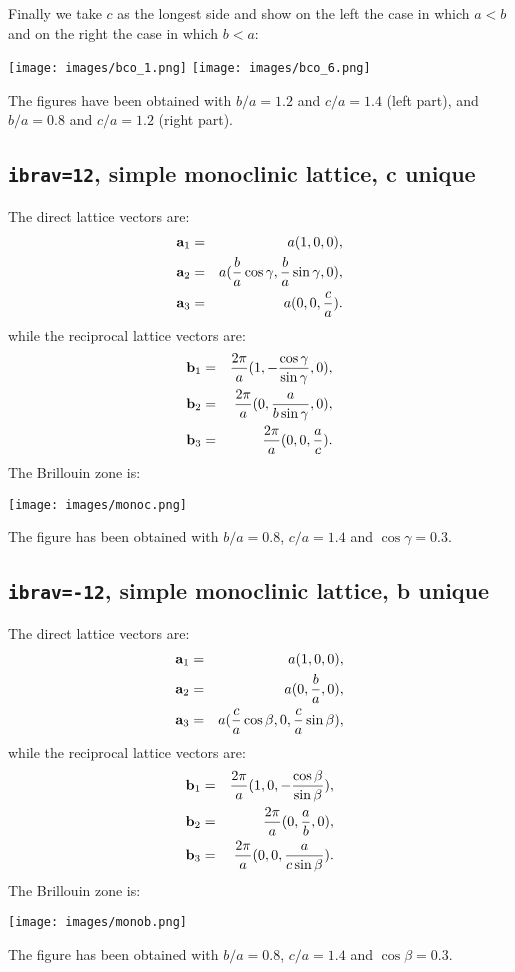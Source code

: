 \documentclass[12pt,a4paper]{article}
\begin{document}
Finally we take $c$ as the longest side and show on the left the case in 
which $a<b$ and on the right the case in which $b<a$:
\begin{center}
\texttt{[image: images/bco\_1.png]} \hspace{1.0 cm}
\texttt{[image: images/bco\_6.png]}
\end{center}
The figures have been obtained with $b/a=1.2$ and $c/a=1.4$ (left part), and
$b/a=0.8$ and $c/a=1.2$ (right part).

\subsection{\texttt{ibrav=12}, simple monoclinic lattice, c unique}
The direct lattice vectors are:
\begin{eqnarray}
{\bf a}_1 &=& a (1, 0, 0), \nonumber \\
{\bf a}_2 &=& a ({b \over a} \cos{\gamma}, {b \over a}\sin{\gamma}, 0), \nonumber \\
{\bf a}_3 &=& a (0, 0, {c \over a}). 
\nonumber
\end{eqnarray}
while the reciprocal lattice vectors are:
\begin{eqnarray}
{\bf b}_1 &=& {2\pi \over a} (1, -{\cos{\gamma}\over \sin{\gamma}}, 0), \nonumber \\
{\bf b}_2 &=& {2\pi \over a} (0, {a \over b \sin{\gamma}}, 0), \nonumber \\
{\bf b}_3 &=& {2\pi \over a} (0, 0, {a \over c}). \nonumber
\end{eqnarray}
The Brillouin zone is: 
\begin{center}
\texttt{[image: images/monoc.png]} 
\end{center}
The figure has been obtained with $b/a=0.8$, $c/a=1.4$ and $\cos{\gamma}=0.3$.

\subsection{\texttt{ibrav=-12}, simple monoclinic lattice, b unique}
The direct lattice vectors are:
\begin{eqnarray}
{\bf a}_1 &=& a (1, 0, 0), \nonumber \\
{\bf a}_2 &=& a (0, {b \over a}, 0), \nonumber \\
{\bf a}_3 &=& a ({c \over a} \cos{\beta}, 0, {c \over a}\sin{\beta}), \nonumber 
\end{eqnarray}
while the reciprocal lattice vectors are:
\begin{eqnarray}
{\bf b}_1 &=& {2\pi \over a} (1, 0, -{\cos{\beta}\over \sin{\beta}}), \nonumber \\
{\bf b}_2 &=& {2\pi \over a} (0, {a \over b}, 0), \nonumber \\
{\bf b}_3 &=& {2\pi \over a} (0, 0, {a \over c \sin{\beta}}). \nonumber
\end{eqnarray}
The Brillouin zone is: 
\begin{center}
\texttt{[image: images/monob.png]} 
\end{center}
The figure has been obtained with $b/a=0.8$, $c/a=1.4$ and $\cos{\beta}=0.3$.
\end{document}
